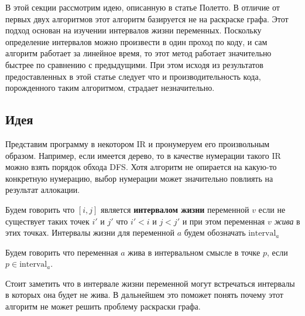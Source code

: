 В этой секции рассмотрим идею, описанную в статье Полетто. В отличие от первых двух алгоритмов
этот алгоритм базируется не на раскраске графа. Этот подход основан на изучении интервалов жизни
переменных. Поскольку определение интервалов можно произвести в один проход по коду, и сам алгоритм
работает за линейное время, то этот метод работает значительно быстрее по сравнению с предыдущими.
При этом исходя из результатов предоставленных в этой статье следует что и производительность
кода, порожденного таким алгоритмом, страдает незначительно.


\subsection{Идея}

Представим программу в некотором IR и пронумеруем его произвольным образом.
Например, если имеется дерево, то в качестве нумерации такого IR можно взять порядок обхода DFS.
Хотя алгоритм не опирается на какую-то конкретную нумерацию,
выбор нумерации может значительно повлиять на результат аллокации.


\begin{definition}
    Будем говорить что $[i, j]$ является \textbf{интервалом жизни} переменной $v$ если не существует таких
    точек $i'$ и $j'$ что $i' < i$ и $j < j'$ и при этом переменная $v$ \textit{жива} в этих точках.
    Интервалы жизни для переменной $a$ будем обозначать $\text{interval}_a$
\end{definition}

\begin{definition}
    Будем говорить что переменная $a$ жива в интервальном смысле в точке $p$, если $p \in \text{interval}_a$. 
\end{definition}

Стоит заметить что в интервале жизни переменной могут встречаться интервалы в которых она будет
не жива. В дальнейшем это поможет понять почему этот алгоритм не может решить проблему раскраски графа.

